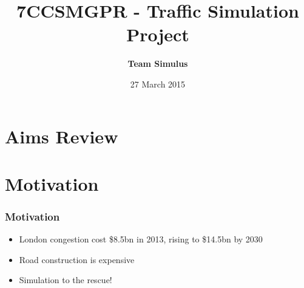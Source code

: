 \documentclass{beamer}
\title[Welcome]{7CCSMGPR - Traffic Simulation Project} %
\author{\textbf{Team Simulus}} %
\institute[KCL] %
{
King's College London \\ %
\medskip
\textit{https://github.com/leorohr/simulus} %
}
\date{27 March 2015} %
\begin{document}
\begin{frame}
\titlepage %
\end{frame}



\section{Aims Review} %


\section{Motivation}

\begin{frame}
\frametitle{Motivation}

\begin{itemize}
	\item London congestion cost \$8.5bn in 2013, rising to \$14.5bn by 2030
	\item Road construction is expensive
	\item Simulation to the rescue!
\end{itemize}

\end{frame}
\end{document}
